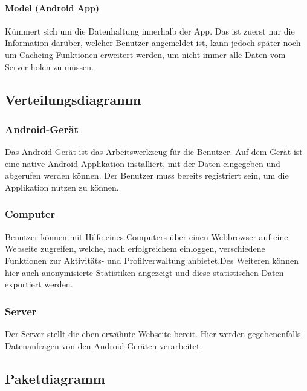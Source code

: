 \paragraph{Model (Android App)} Kümmert sich um die Datenhaltung innerhalb der App. Das ist zuerst nur die Information darüber, welcher Benutzer angemeldet ist, kann jedoch später noch um Cacheing-Funktionen erweitert werden, um nicht immer alle Daten vom Server holen zu müssen.

\subsection{Verteilungsdiagramm}

\subsubsection{Android-Gerät}
Das Android-Gerät ist das Arbeitswerkzeug für die Benutzer. Auf dem Gerät ist eine native Android-Applikation installiert, mit der Daten eingegeben und abgerufen werden können. Der Benutzer muss bereits registriert sein, um die Applikation nutzen zu können.
\subsubsection{Computer}
Benutzer können mit Hilfe eines Computers über einen Webbrowser auf eine Webseite zugreifen, welche, nach erfolgreichem einloggen, verschiedene Funktionen zur Aktivitäts- und Profilverwaltung anbietet.Des Weiteren können hier auch anonymisierte Statistiken angezeigt und diese statistischen Daten exportiert werden.
\subsubsection{Server}
Der Server stellt die eben erwähnte Webseite bereit. Hier werden gegebenenfalls Datenanfragen von den Android-Geräten verarbeitet.
\subsection{Paketdiagramm}
